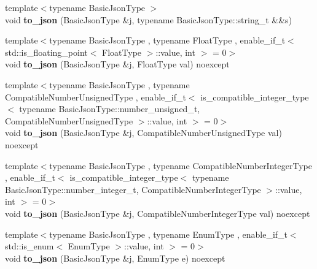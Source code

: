 \begin{DoxyCompactItemize}
\item 
{\footnotesize template$<$typename Basic\+Json\+Type $>$ }\\void {\bfseries to\+\_\+json} (Basic\+Json\+Type \&j, typename Basic\+Json\+Type\+::string\+\_\+t \&\&s)\hypertarget{namespacenlohmann_1_1detail_a4aa1ca6b7c61bf19d1f30ea5b669f68e}{}\label{namespacenlohmann_1_1detail_a4aa1ca6b7c61bf19d1f30ea5b669f68e}

\item 
{\footnotesize template$<$typename Basic\+Json\+Type , typename Float\+Type , enable\+\_\+if\+\_\+t$<$ std\+::is\+\_\+floating\+\_\+point$<$ Float\+Type $>$\+::value, int $>$  = 0$>$ }\\void {\bfseries to\+\_\+json} (Basic\+Json\+Type \&j, Float\+Type val) noexcept\hypertarget{namespacenlohmann_1_1detail_a22bffdc8bc7e43af380ba2050696b230}{}\label{namespacenlohmann_1_1detail_a22bffdc8bc7e43af380ba2050696b230}

\item 
{\footnotesize template$<$typename Basic\+Json\+Type , typename Compatible\+Number\+Unsigned\+Type , enable\+\_\+if\+\_\+t$<$ is\+\_\+compatible\+\_\+integer\+\_\+type$<$ typename Basic\+Json\+Type\+::number\+\_\+unsigned\+\_\+t, Compatible\+Number\+Unsigned\+Type $>$\+::value, int $>$  = 0$>$ }\\void {\bfseries to\+\_\+json} (Basic\+Json\+Type \&j, Compatible\+Number\+Unsigned\+Type val) noexcept\hypertarget{namespacenlohmann_1_1detail_ae5fd66b5517b3b5a6c6b9fd9f29ba8dc}{}\label{namespacenlohmann_1_1detail_ae5fd66b5517b3b5a6c6b9fd9f29ba8dc}

\item 
{\footnotesize template$<$typename Basic\+Json\+Type , typename Compatible\+Number\+Integer\+Type , enable\+\_\+if\+\_\+t$<$ is\+\_\+compatible\+\_\+integer\+\_\+type$<$ typename Basic\+Json\+Type\+::number\+\_\+integer\+\_\+t, Compatible\+Number\+Integer\+Type $>$\+::value, int $>$  = 0$>$ }\\void {\bfseries to\+\_\+json} (Basic\+Json\+Type \&j, Compatible\+Number\+Integer\+Type val) noexcept\hypertarget{namespacenlohmann_1_1detail_a91fe576be579c8c2fdd14610605c6dd2}{}\label{namespacenlohmann_1_1detail_a91fe576be579c8c2fdd14610605c6dd2}

\item 
{\footnotesize template$<$typename Basic\+Json\+Type , typename Enum\+Type , enable\+\_\+if\+\_\+t$<$ std\+::is\+\_\+enum$<$ Enum\+Type $>$\+::value, int $>$  = 0$>$ }\\void {\bfseries to\+\_\+json} (Basic\+Json\+Type \&j, Enum\+Type e) noexcept\hypertarget{namespacenlohmann_1_1detail_a0c8b159dba71981d6c555d284cf6e2bf}{}\label{namespacenlohmann_1_1detail_a0c8b159dba71981d6c555d284cf6e2bf}


\end{DoxyCompactItemize}
